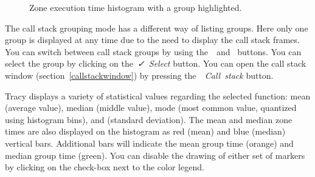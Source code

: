 \documentclass[hidelinks,titlepage,a4paper]{article}
\begin{document}
\begin{figure}[h]
\centering{}
\caption{Zone execution time histogram with a group highlighted.}
\label{findzonehistogramgroup}
\end{figure}

The call stack grouping mode has a different way of listing groups. Here only one group is displayed at any time due to the need to display the call stack frames. You can switch between call stack groups by using the~\faCaretLeft{}~and~\faCaretRight{} buttons. You can select the group by clicking on the~\emph{\faCheck{}~Select} button. You can open the call stack window (section~\ref{callstackwindow}) by pressing the~\emph{\faAlignJustify{}~Call~stack} button.

Tracy displays a variety of statistical values regarding the selected function: mean (average value), median (middle value), mode (most common value, quantized using histogram bins), and \textsigma{} (standard deviation). The mean and median zone times are also displayed on the histogram as red (mean) and blue (median) vertical bars. Additional bars will indicate the mean group time (orange) and median group time (green). You can disable the drawing of either set of markers by clicking on the check-box next to the color legend.
\end{document}
